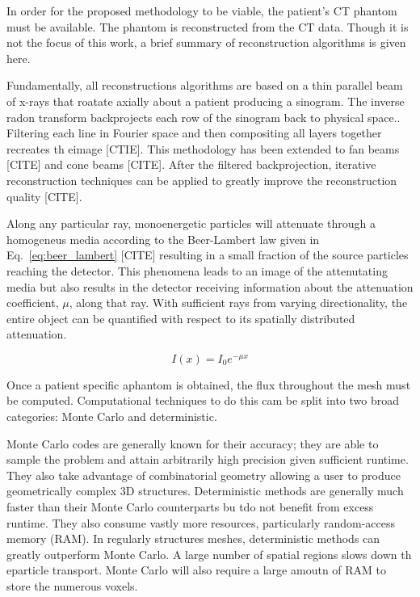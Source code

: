 In order for the proposed methodology to be viable, the patient's CT phantom must be available. The phantom is reconstructed from the CT data. Though it is not the focus of this work, a brief summary of reconstruction algorithms is given here.

Fundamentally, all reconstructions algorithms are based on a thin parallel beam of x-rays that roatate axially about a patient producing a sinogram. The inverse radon transform backprojects each row of the sinogram back to physical space.. Filtering each line in Fourier space and then compositing all layers together recreates th eimage [CTIE]. This methodology has been extended to fan beams [CITE] and cone beams [CITE]. After the filtered backprojection, iterative reconstruction techniques can be applied to greatly improve the reconstruction quality [CITE].

Along any particular ray, monoenergetic particles will attenuate through a homogeneus media according to the Beer-Lambert law given in Eq.~\ref{eq:beer_lambert} [CITE] resulting in a small fraction of the source particles reaching the detector. This phenomena leads to an image of the attenutating media but also results in the detector receiving information about the attenuation coefficient, $\mu$, along that ray. With sufficient rays from varying directionality, the entire object can be quantified with respect to its spatially distributed attenuation.

\begin{equation}\label{eq:beer_lambert}
I(x) = I_0 e^{-\mu x}
\end{equation}

Once a patient specific aphantom is obtained, the flux throughout the mesh must be computed. Computational techniques to do this cam be split into two broad categories: Monte Carlo and deterministic.

Monte Carlo codes are generally known for their accuracy; they are able to sample the problem and attain arbitrarily high precision given sufficient runtime. They also take advantage of combinatorial geometry allowing a user to produce geometrically complex 3D structures. Deterministic methods are generally much faster than their Monte Carlo counterparts bu tdo not benefit from excess runtime. They also consume vastly more resources, particularly random-access memory (RAM). In regularly structures meshes, deterministic methods can greatly outperform Monte Carlo. A large number of spatial regions slows down th eparticle transport. Monte Carlo will also require a large amoutn of RAM to store the numerous voxels.

